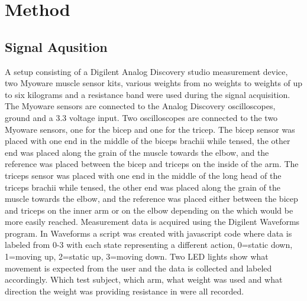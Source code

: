 \section{Method}
\label{section:method}



\subsection{Signal Aqusition}
A setup consisting of a Digilent Analog Discovery studio measurement device, two Myoware muscle sensor 
kits, various weights from no weights to weights of up to six kilograms and a resistance 
band were used during the signal acquisition. The Myoware sensors are connected to the Analog Discovery 
oscilloscopes, ground and a 3.3 voltage input. Two oscilloscopes are connected to the two Myoware 
sensors, one for the bicep and one for the tricep. The bicep sensor was placed with one end in the 
middle of the biceps brachii while tensed, the other end was placed along the grain of the muscle 
towards the elbow, and the reference was placed between the bicep and triceps on the inside of the arm. 
The triceps sensor was placed with one end in the middle of the long head of the triceps brachii while 
tensed, the other end was placed along the grain of the muscle towards the elbow, and the reference was 
placed either between the bicep and triceps on the inner arm or on the elbow depending on the which would 
be more easily reached. Measurement data is acquired using the Digilent Waveforms program. In Waveforms a 
script was created with javascript code where data is labeled from 0-3 with each state representing a 
different action, 0=static down, 1=moving up, 2=static up, 3=moving down. Two LED lights show what 
movement is expected from the user and the data is collected and labeled accordingly. Which test subject, 
which arm, what weight was used and what direction the weight was providing resistance in were all recorded.


